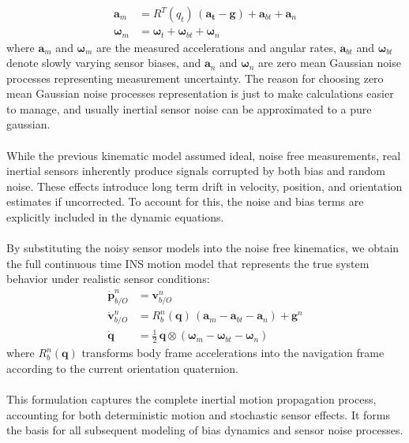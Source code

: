 $$
\begin{aligned}
    \mathbf{a}_m &= R^{T}(q_t)\,(\mathbf{a_t} - \mathbf{g}) + \mathbf{a}_{bt} + \mathbf{a}_{n} \\
    \boldsymbol{\omega}_m &= \boldsymbol{\omega}_t + \mathbf{\omega}_{bt} + \mathbf{\omega}_{n}
\end{aligned}
$$
where $\mathbf{a}_m$ and $\boldsymbol{\omega}_m$ are the measured accelerations and angular rates, $\mathbf{a}_{bt}$ and $\mathbf{\omega}_{bt}$ denote slowly varying sensor biases, and $\mathbf{a}_{n}$ and $\mathbf{\omega}_{n}$ are zero mean Gaussian noise processes representing measurement uncertainty. The reason for choosing zero mean Gaussian noise processes representation is just to make calculations easier to manage, and usually inertial sensor noise can be approximated to a pure gaussian.  
\\ \\
While the previous kinematic model assumed ideal, noise free measurements, real inertial sensors inherently produce signals corrupted by both bias and random noise. These effects introduce long term drift in velocity, position, and orientation estimates if uncorrected. To account for this, the noise and bias terms are explicitly included in the dynamic equations.  
\\ \\
By substituting the noisy sensor models into the noise free kinematics, we obtain the full continuous time INS motion model that represents the true system behavior under realistic sensor conditions:
$$
\begin{aligned}
    \dot{\mathbf{p}}_{b/O}^{n} &= \mathbf{v}_{b/O}^{n} \\
    \dot{\mathbf{v}}_{b/O}^{n} &= R_b^n(\mathbf{q})\,(\mathbf{a}_m - \mathbf{a}_{bt} - \mathbf{a}_n) + \mathbf{g}^n \\
    \dot{\mathbf{q}} &= \tfrac{1}{2}\,\mathbf{q} \otimes (\boldsymbol{\omega}_m - \mathbf{\omega}_{bt} - \mathbf{\omega}_n)
\end{aligned}
$$
where $R_b^n(\mathbf{q})$ transforms body frame accelerations into the navigation frame according to the current orientation quaternion.  
\\ \\
This formulation captures the complete inertial motion propagation process, accounting for both deterministic motion and stochastic sensor effects. It forms the basis for all subsequent modeling of bias dynamics and sensor noise processes.
\\ \\
